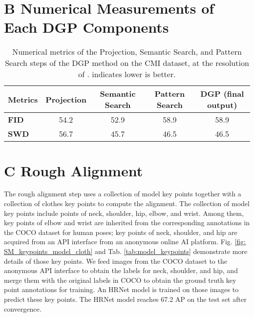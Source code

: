 \documentclass[10pt,twocolumn,letterpaper]{article}
\newcommand{\FID}{\textbf{FID}}  \newcommand{\PPL}{\textbf{PPL}}  \newcommand{\SSIM}{\textbf{SSIM}}  \newcommand{\SWD}{\textbf{SWD}}
\begin{document}
\section*{B Numerical Measurements of Each DGP Components}
\begin{table}[h]
\caption{
    Numerical metrics of the Projection, Semantic Search, and Pattern Search steps of the DGP method on the CMI dataset, at the resolution of .  indicates lower is better.
  }
  \label{tab:metrics_s}
  \centering
  \begin{tabular}{lcccc}
		\toprule
		Metrics & Projection & Semantic Search & Pattern Search & DGP (final output) \\
		\midrule
		\FID & 54.2 & 52.9 & 58.9 & 58.9 \\
		\SWD & 56.7 & 45.7 & 46.5 & 46.5 \\
		\bottomrule
	\end{tabular} 
\end{table}


\section*{C Rough Alignment}

The rough alignment step uses a collection of model key points together with a collection of clothes key points to compute the alignment. The collection of model key points include points of neck, shoulder, hip, elbow, and wrist. Among them, key points of elbow and wrist are inherited from the corresponding annotations in the COCO \cite{lin2014microsoft} dataset for human poses; key points of neck, shoulder, and hip are acquired from an API interface from an anonymous online AI platform. Fig. \ref{fig: SM_keypoints_model_cloth} and Tab. \ref{tab:model_keypoints} demonstrate more details of those key points. 
We feed images from the COCO dataset to the anonymous API interface to obtain the labels for neck, shoulder, and hip, and merge them with the original labels in COCO to obtain the ground truth key point annotations for training. 
An HRNet \cite{sun2019deep} model is trained on those images to predict these key points. The HRNet model reaches 67.2 AP on the test set after convergence. 
\end{document}
